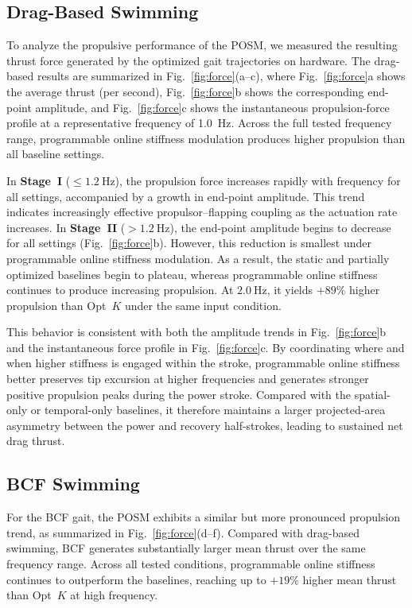 \subsection{Drag-Based Swimming}

To analyze the propulsive performance of the POSM, we measured the resulting thrust force generated by the optimized gait trajectories on hardware. The drag-based results are summarized in Fig.~\ref{fig:force}(a--c), where Fig.~\ref{fig:force}a shows the average thrust (per second), Fig.~\ref{fig:force}b shows the corresponding end-point amplitude, and Fig.~\ref{fig:force}c shows the instantaneous propulsion-force profile at a representative frequency of 1.0~Hz. Across the full tested frequency range, programmable online stiffness modulation produces higher propulsion than all baseline settings.

In \textbf{Stage~I} (\(\leq 1.2~\mathrm{Hz}\)), the propulsion force increases rapidly with frequency for all settings, accompanied by a growth in end-point amplitude. This trend indicates increasingly effective propulsor--flapping coupling as the actuation rate increases. In \textbf{Stage~II} (\(> 1.2~\mathrm{Hz}\)), the end-point amplitude begins to decrease for all settings (Fig.~\ref{fig:force}b). However, this reduction is smallest under programmable online stiffness modulation. As a result, the static and partially optimized baselines begin to plateau, whereas programmable online stiffness continues to produce increasing propulsion. At \(2.0~\mathrm{Hz}\), it yields \(+89\%\) higher propulsion than Opt~\(K\) under the same input condition.

This behavior is consistent with both the amplitude trends in Fig.~\ref{fig:force}b and the instantaneous force profile in Fig.~\ref{fig:force}c. By coordinating where and when higher stiffness is engaged within the stroke, programmable online stiffness better preserves tip excursion at higher frequencies and generates stronger positive propulsion peaks during the power stroke. Compared with the spatial-only or temporal-only baselines, it therefore maintains a larger projected-area asymmetry between the power and recovery half-strokes, leading to sustained net drag thrust.

\subsection{BCF Swimming}

For the BCF gait, the POSM exhibits a similar but more pronounced propulsion trend, as summarized in Fig.~\ref{fig:force}(d--f). Compared with drag-based swimming, BCF generates substantially larger mean thrust over the same frequency range. Across all tested conditions, programmable online stiffness continues to outperform the baselines, reaching up to \(+19\%\) higher mean thrust than Opt~\(K\) at high frequency.

